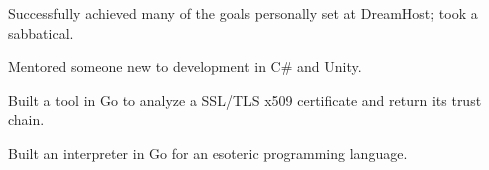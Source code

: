 \item Successfully achieved many of the goals personally set at DreamHost; took a sabbatical.
\item Mentored someone new to development in C\# and Unity.
\item Built a tool in Go to analyze a SSL/TLS x509 certificate and return its trust chain.
\item Built an interpreter in Go for an esoteric programming language. %

